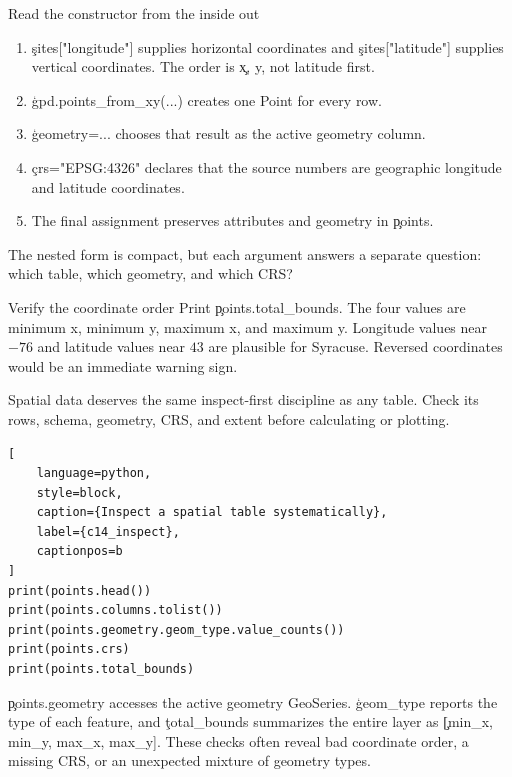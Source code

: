 \begin{SyntaxBox}{Read the constructor from the inside out}
\begin{enumerate}
    \item \c{sites["longitude"]} supplies horizontal coordinates and
          \c{sites["latitude"]} supplies vertical coordinates. The order is
          \c{x, y}, not latitude first.
    \item \c{gpd.points_from_xy(...)} creates one Point for every row.
    \item \c{geometry=...} chooses that result as the active geometry column.
    \item \c{crs="EPSG:4326"} declares that the source numbers are geographic
          longitude and latitude coordinates.
    \item The final assignment preserves attributes and geometry in \c{points}.
\end{enumerate}
The nested form is compact, but each argument answers a separate question:
which table, which geometry, and which CRS?
\end{SyntaxBox}

\begin{TryBox}{Verify the coordinate order}
Print \c{points.total_bounds}. The four values are minimum x, minimum y,
maximum x, and maximum y. Longitude values near $-76$ and latitude values near
$43$ are plausible for Syracuse. Reversed coordinates would be an immediate
warning sign.
\end{TryBox}


Spatial data deserves the same inspect-first discipline as any table. Check
its rows, schema, geometry, CRS, and extent before calculating or plotting.

\begin{lstlisting}[
    language=python,
    style=block,
    caption={Inspect a spatial table systematically},
    label={c14_inspect},
    captionpos=b
]
print(points.head())
print(points.columns.tolist())
print(points.geometry.geom_type.value_counts())
print(points.crs)
print(points.total_bounds)
\end{lstlisting}

\c{points.geometry} accesses the active geometry GeoSeries.
\c{geom_type} reports the type of each feature, and \c{total_bounds} summarizes
the entire layer as \c{[min_x, min_y, max_x, max_y]}. These checks often reveal
bad coordinate order, a missing CRS, or an unexpected mixture of geometry types.

